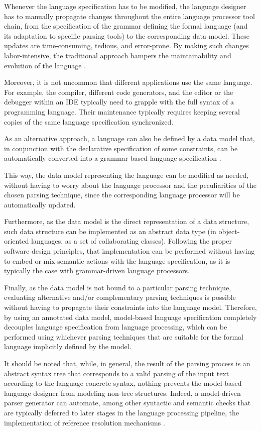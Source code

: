 \documentclass[preprint]{elsarticle}
\begin{document}
Whenever the language specification has to be modified, the language designer has to manually propagate changes throughout the entire language processor tool chain, from the specification of the grammar defining the formal language (and its adaptation to specific parsing tools) to the corresponding data model.
These updates are time-consuming, tedious, and error-prone.
By making such changes labor-intensive, the traditional approach hampers the maintainability and evolution of the language \cite{Kats2010}.

Moreover, it is not uncommon that different applications use the same language.
For example, the compiler, different code generators, and the editor or the debugger within an IDE typically need to grapple with the full syntax of a programming language.
Their maintenance typically requires keeping several copies of the same language specification synchronized.

As an alternative approach, a language can also be defined by a data model that, in conjunction with the declarative specification of some constraints, can be automatically converted into a grammar-based language specification \cite{Quesada2011c}.

This way, the data model representing the language can be modified as needed, without having to worry about the language processor and the peculiarities of the chosen parsing technique, since the corresponding language processor will be automatically updated.

Furthermore, as the data model is the direct representation of a data structure, such data structure can be implemented as an abstract data type (in object-oriented languages, as a set of collaborating classes).
Following the proper software design principles, that implementation can be performed without having to embed or mix semantic actions with the language specification, as it is typically the case with grammar-driven language processors.

Finally, as the data model is not bound to a particular parsing technique, evaluating alternative and/or complementary parsing techniques is possible without having to propagate their constraints into the language model.
Therefore, by using an annotated data model, model-based language specification completely decouples language specification from language processing, which can be performed using whichever parsing techniques that are suitable for the formal language implicitly defined by the model.

It should be noted that, while, in general, the result of the parsing process is an abstract syntax tree that corresponds to a valid parsing of the input text according to the language concrete syntax, nothing prevents the model-based language designer from modeling non-tree structures.
Indeed, a model-driven parser generator can automate, among other syntactic and semantic checks that are typically deferred to later stages in the language processing pipeline, the implementation of reference resolution mechanisms \cite{Quesada2012k,Quesada2014a}.
\end{document}
